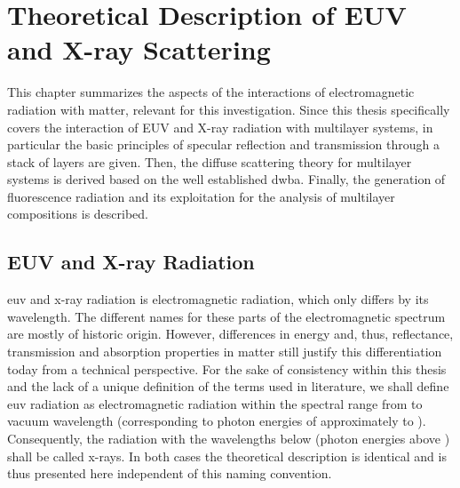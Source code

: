 \chapter{Theoretical Description of EUV and X-ray Scattering} \label{ch_theo}
This chapter summarizes the aspects of the interactions of electromagnetic radiation with matter, relevant for this investigation. Since this thesis specifically covers the interaction of EUV and X-ray radiation with multilayer systems, in particular the basic principles of specular reflection and transmission through a stack of layers are given. Then, the diffuse scattering theory for multilayer systems is derived based on the well established \glsdesc{dwba}. Finally, the generation of fluorescence radiation and its exploitation for the analysis of multilayer compositions is described.

\section{EUV and X-ray Radiation}
\Gls{euv} and x-ray radiation is electromagnetic radiation, which only differs by its wavelength. The different names for these parts of the electromagnetic spectrum are mostly of historic origin. However, differences in energy and, thus, reflectance, transmission and absorption properties in matter still justify this differentiation today from a technical perspective. For the sake of consistency within this thesis and the lack of a unique definition of the terms used in literature, we shall define \gls{euv} radiation as electromagnetic radiation within the spectral range from  to  vacuum wavelength (corresponding to photon energies of approximately  to ). Consequently, the radiation with the wavelengths below  (photon energies above ) shall be called x-rays. In both cases the theoretical description is identical and is thus presented here independent of this naming convention.

